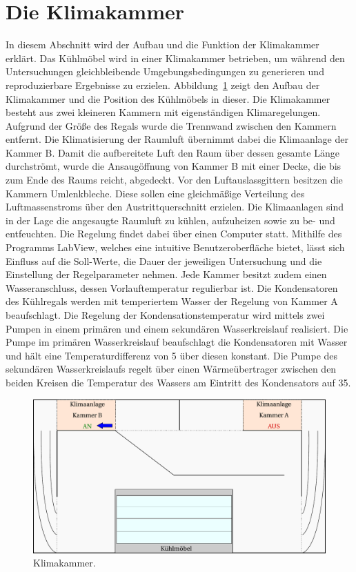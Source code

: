 \section{Die Klimakammer}
\label{sec:Die Klimakammer}

In diesem Abschnitt wird der Aufbau und die Funktion der Klimakammer erklärt.
Das Kühlmöbel wird in einer Klimakammer betrieben, um während den Untersuchungen gleichbleibende Umgebungsbedingungen zu generieren und reproduzierbare Ergebnisse zu erzielen.
Abbildung~\ref{fig:Klimakammer} zeigt den Aufbau der Klimakammer und die Position des Kühlmöbels in dieser.
Die Klimakammer besteht aus zwei kleineren Kammern mit eigenständigen Klimaregelungen. Aufgrund der Größe des Regals wurde die Trennwand zwischen den Kammern entfernt. Die Klimatisierung der Raumluft übernimmt dabei die Klimaanlage der Kammer B. Damit die aufbereitete Luft den Raum über dessen gesamte Länge durchströmt, wurde die Ansaugöffnung von Kammer B mit einer Decke, die bis zum Ende des Raums reicht, abgedeckt. Vor den Luftauslassgittern besitzen die Kammern Umlenkbleche. Diese sollen eine gleichmäßige Verteilung des Luftmassenstroms über den Austrittquerschnitt erzielen. Die Klimaanlagen sind in der Lage die angesaugte Raumluft zu kühlen, aufzuheizen sowie zu be- und entfeuchten. Die Regelung findet dabei über einen Computer statt. Mithilfe des Programms LabView, welches eine intuitive Benutzeroberfläche bietet, lässt sich Einfluss auf die Soll-Werte, die Dauer der jeweiligen Untersuchung und die Einstellung der Regelparameter nehmen. 
Jede Kammer besitzt zudem einen Wasseranschluss, dessen Vorlauftemperatur regulierbar ist.
Die Kondensatoren des Kühlregals werden mit temperiertem Wasser der Regelung von Kammer A beaufschlagt. Die Regelung der Kondensationstemperatur wird mittels zwei Pumpen in einem primären und einem sekundären Wasserkreislauf realisiert. Die Pumpe im primären Wasserkreislauf beaufschlagt die Kondensatoren mit Wasser und hält eine Temperaturdifferenz von \unit{5}{\kelvin} über diesen konstant. Die Pumpe des sekundären Wasserkreislaufs regelt über einen Wärmeübertrager zwischen den beiden Kreisen die Temperatur des Wassers am Eintritt des Kondensators auf \unit{35}{\celsius}.


\begin{figure}[htb]
\centering
\includegraphics[scale=.6]{Pictures/ClimateChamber.pdf}
\caption{Klimakammer.}
\label{fig:Klimakammer}
\end{figure}

